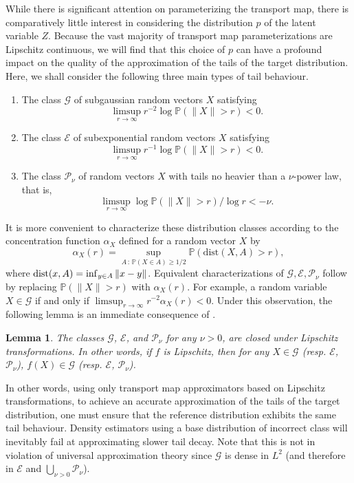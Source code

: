\documentclass{scrartcl}
\newtheorem{lemma}{Lemma}
\theoremstyle{definition}
\begin{document}
While there is significant attention on parameterizing the transport map, there is comparatively little interest in considering the distribution $p$ of the latent variable $Z$. Because the vast majority of transport map parameterizations are Lipschitz continuous, we will find that this choice of $p$ can have a profound impact on the quality of the approximation of the tails of the target distribution. Here, we shall consider the following three main types of tail behaviour.
\begin{enumerate}
    \item The class $\mathcal{G}$ of subgaussian random vectors $X$ satisfying \[\limsup_{r\to\infty}r^{-2}\log\mathbb{P}(\|X\|>r)<0.\]
    \item The class $\mathcal{E}$ of subexponential random vectors $X$ satisfying \[\limsup_{r\to\infty}r^{-1}\log\mathbb{P}(\|X\|>r)<0.\]
    \item The class $\mathcal{P}_\nu$ of random vectors $X$ with tails no heavier than a $\nu$-power law, that is, \[\limsup_{r\to\infty}\log\mathbb{P}(\|X\|>r)/\log r<-\nu.\]
\end{enumerate}
It is more convenient to characterize these distribution classes according to the concentration function $\alpha_X$ defined for a random vector $X$ by
\[
    \alpha_{X}(r)=\sup_{A\,:\,\mathbb{P}(X\in A)\geq1/2}\mathbb{P}(\mbox{dist}(X,A)>r),
\]
where $\mathrm{dist}(x,A) = \inf_{y \in A}\|x - y\|$. Equivalent characterizations of $\mathcal{G},\mathcal{E},\mathcal{P}_\nu$ follow by replacing $\mathbb{P}(\|X\|>r)$ with $\alpha_X(r)$. For example, a random variable $X \in \mathcal{G}$ if and only if $\limsup_{r\to\infty} r^{-2} \alpha_X(r) < 0$. Under this observation, the following lemma is an immediate consequence of \cite[Proposition 1.3]{ledoux2001concentration}.
\begin{lemma}
    \label{lem:distn_class_closed}
    The classes $\mathcal{G}$, $\mathcal{E}$, and $\mathcal{P}_\nu$ for any $\nu > 0$, are closed under Lipschitz transformations. In other words, if $f$ is Lipschitz, then for any $X \in \mathcal{G}$ (resp. $\mathcal{E}$, $\mathcal{P}_\nu$), $f(X) \in \mathcal{G}$ (resp. $\mathcal{E}$, $\mathcal{P}_\nu$). 
\end{lemma}
In other words, using only transport map approximators based on Lipschitz transformations, to achieve an accurate approximation of the tails of the target distribution, one must ensure that the reference distribution exhibits the same tail behaviour. Density estimators using a base distribution of incorrect class will inevitably fail at approximating slower tail decay. Note that this is not in violation of universal approximation theory since $\mathcal{G}$ is dense in $L^{2}$ (and therefore in $\mathcal{E}$ and $\bigcup_{\nu>0}\mathcal{P}_{\nu}$). 
\end{document}
